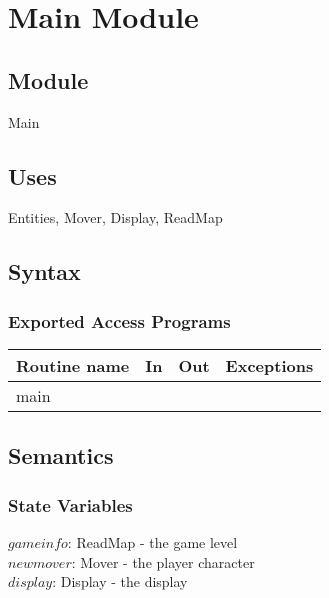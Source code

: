 \documentclass[12pt]{article}
\begin{document}
\newpage

\section*{Main Module}

\subsection*{Module}

Main

\subsection*{Uses}

Entities, Mover, Display, ReadMap

\subsection*{Syntax}

\subsubsection*{Exported Access Programs}

\begin{tabular}{| l | l | l | l |}
\hline
\textbf{Routine name} & \textbf{In} & \textbf{Out} & \textbf{Exceptions}\\
\hline
main & ~ & ~ & ~\\
\hline
\end{tabular}

\subsection*{Semantics}

\subsubsection*{State Variables}

$gameinfo$: ReadMap - the game level\\
$newmover$: Mover - the player character\\
$display$: Display - the display


\end{document}

